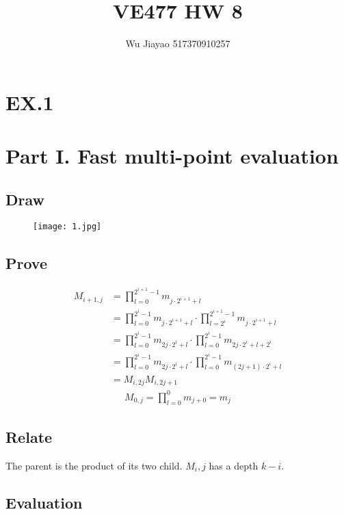 \documentclass[12pt,a4paper]{article}
\title{VE477 HW 8}
\author{Wu Jiayao 517370910257}
\theoremstyle{definition}
\begin{document}
\maketitle
\section{EX.1}
\section*{Part I. Fast multi-point evaluation}
\subsection{Draw}
\begin{figure}[h]
  \texttt{[image: 1.jpg]}
\end{figure}
\subsection{Prove}
\begin{align*}
  M_{i+1,j}&=\prod_{l=0}^{2^{i+1}-1}m_{j\cdot 2^{i+1}+l} \\
          &=\prod_{l=0}^{2^{i}-1}m_{j\cdot 2^{i+1}+l} \cdot \prod_{l=2^i}^{2^{i+1}-1}m_{j\cdot 2^{i+1}+l} \\
          &=\prod_{l=0}^{2^{i}-1}m_{2j\cdot 2^{i}+l} \cdot \prod_{l=0}^{2^{i}-1}m_{2j\cdot 2^{i}+l+2^{i}} \\
          &=\prod_{l=0}^{2^{i}-1}m_{2j\cdot 2^{i}+l} \cdot \prod_{l=0}^{2^{i}-1}m_{(2j+1)\cdot 2^{i}+l} \\
          &= M_{i,2j}M_{i,2j+1}
\end{align*}
\begin{align*}
  M_{0,j}=\prod_{l=0}^{0}m_{j+0}=m_j
\end{align*}
\subsection{Relate}
  The parent is the product of its two child. $M_i,j$ has a depth $k-i$.
\subsection{Evaluation}
\end{document}
